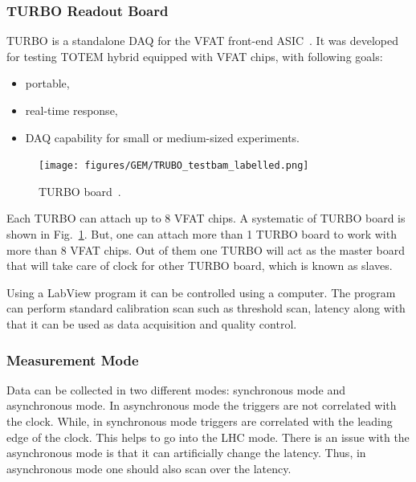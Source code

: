 
\subsubsection{TURBO Readout Board} %
\label{ssub:turbo_readout_board}
TURBO is a standalone DAQ for the VFAT front-end ASIC~\cite{Paschalis2011}. It was developed for testing TOTEM hybrid equipped with VFAT chips, with following goals:
\begin{itemize}
    \item portable,
    \item real-time response,
    \item DAQ capability for small or medium-sized experiments.
\end{itemize}
\begin{figure}[htbp]
    \centering
    \texttt{[image: figures/GEM/TRUBO\_testbam\_labelled.png]}
    \caption{TURBO board~\cite{Paschalis2011}.}
    \label{fig:turbo}
\end{figure}
Each TURBO can attach up to 8 VFAT chips. 
A systematic of TURBO board is shown in Fig.~\ref{fig:turbo}. 
But, one can attach more than 1 TURBO board to work with more than 8 VFAT chips. 
Out of them one TURBO will act as the master board that will take care of clock for other TURBO board, which is known as slaves.

Using a LabView program it can be controlled using a computer. 
The program can perform standard calibration scan such as threshold scan, latency along with that it can be used as data acquisition and quality control.


\subsubsection{Measurement Mode} %
\label{ssub:measurement_mode}
Data can be collected in two different modes: synchronous mode and asynchronous mode. In asynchronous mode the triggers are not correlated with the clock. While, in synchronous mode triggers are correlated with the leading edge of the clock. This helps to go into the LHC mode. There is an issue with the asynchronous mode is that it can artificially change the latency. Thus, in asynchronous mode one should also scan over the latency.

